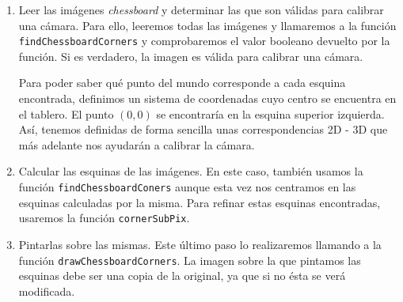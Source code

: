 \documentclass[11pt,a4paper]{article}
\theoremstyle{plain}
\theoremstyle{definition}
\begin{document}
\begin{enumerate}
\item Leer las imágenes \textit{chessboard} y determinar las que son válidas para calibrar una cámara. Para ello, leeremos todas las imágenes y llamaremos a la función \texttt{findChessboardCorners} y comprobaremos el valor booleano devuelto por la función. Si es verdadero, la imagen es válida para calibrar una cámara.

Para poder saber qué punto del mundo corresponde a cada esquina encontrada, definimos un sistema de coordenadas cuyo centro se encuentra en el tablero. El punto $(0,0)$ se encontraría en la esquina superior izquierda. Así, tenemos definidas de forma sencilla unas correspondencias 2D - 3D que más adelante nos ayudarán a calibrar la cámara.

\item Calcular las esquinas de las imágenes. En este caso, también usamos la función \texttt{findChessboardConers} aunque esta vez nos centramos en las esquinas calculadas por la misma. Para refinar estas esquinas encontradas, usaremos la función \texttt{cornerSubPix}.

\item Pintarlas sobre las mismas. Este último paso lo realizaremos llamando a la función \texttt{drawChessboardCorners}. La imagen sobre la que pintamos las esquinas debe ser una copia de la original, ya que si no ésta se verá modificada.
\end{enumerate}
\end{document}
